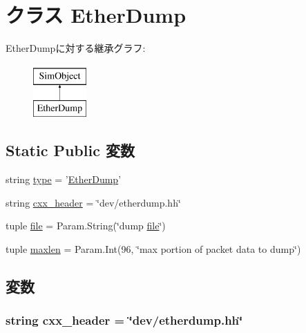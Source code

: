 \hypertarget{classEthernet_1_1EtherDump}{
\section{クラス EtherDump}
\label{classEthernet_1_1EtherDump}
}
EtherDumpに対する継承グラフ:\begin{figure}[H]
\begin{center}
\leavevmode
\includegraphics[height=2cm]{classEthernet_1_1EtherDump}
\end{center}
\end{figure}
\subsection*{Static Public 変数}
\begin{DoxyCompactItemize}
\item 
string \hyperlink{classEthernet_1_1EtherDump_acce15679d830831b0bbe8ebc2a60b2ca}{type} = '\hyperlink{classEthernet_1_1EtherDump}{EtherDump}'
\item 
string \hyperlink{classEthernet_1_1EtherDump_a17da7064bc5c518791f0c891eff05fda}{cxx\_\-header} = \char`\"{}dev/etherdump.hh\char`\"{}
\item 
tuple \hyperlink{classEthernet_1_1EtherDump_a8c17a4dfad23c7a5de93a438838a4e90}{file} = Param.String(\char`\"{}dump \hyperlink{classEthernet_1_1EtherDump_a8c17a4dfad23c7a5de93a438838a4e90}{file}\char`\"{})
\item 
tuple \hyperlink{classEthernet_1_1EtherDump_acf39e345ad6bd1dec0be19540d7da527}{maxlen} = Param.Int(96, \char`\"{}max portion of packet data to dump\char`\"{})
\end{DoxyCompactItemize}


\subsection{変数}
\hypertarget{classEthernet_1_1EtherDump_a17da7064bc5c518791f0c891eff05fda}{
\subsubsection[{cxx\_\-header}]{\setlength{\rightskip}{0pt plus 5cm}string {\bf cxx\_\-header} = \char`\"{}dev/etherdump.hh\char`\"{}}}
\label{classEthernet_1_1EtherDump_a17da7064bc5c518791f0c891eff05fda}


